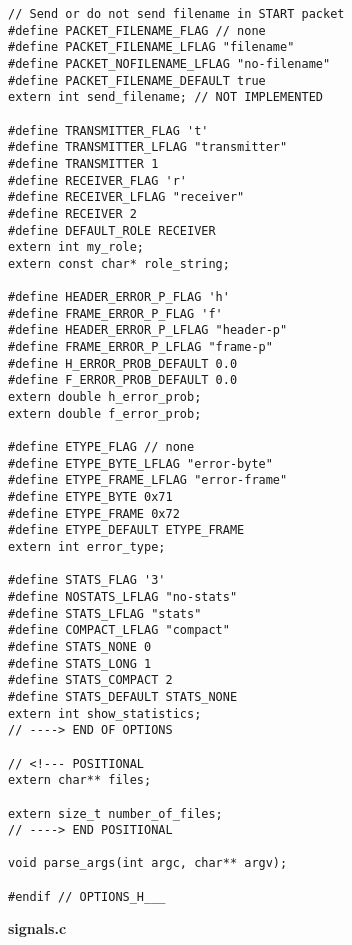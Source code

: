 \documentclass[subfiles]{main.tex}
\begin{document}
\begin{lstlisting}[style=rcom]
// Send or do not send filename in START packet
#define PACKET_FILENAME_FLAG // none
#define PACKET_FILENAME_LFLAG "filename"
#define PACKET_NOFILENAME_LFLAG "no-filename"
#define PACKET_FILENAME_DEFAULT true
extern int send_filename; // NOT IMPLEMENTED

#define TRANSMITTER_FLAG 't'
#define TRANSMITTER_LFLAG "transmitter"
#define TRANSMITTER 1
#define RECEIVER_FLAG 'r'
#define RECEIVER_LFLAG "receiver"
#define RECEIVER 2
#define DEFAULT_ROLE RECEIVER
extern int my_role;
extern const char* role_string;

#define HEADER_ERROR_P_FLAG 'h'
#define FRAME_ERROR_P_FLAG 'f'
#define HEADER_ERROR_P_LFLAG "header-p"
#define FRAME_ERROR_P_LFLAG "frame-p"
#define H_ERROR_PROB_DEFAULT 0.0
#define F_ERROR_PROB_DEFAULT 0.0
extern double h_error_prob;
extern double f_error_prob;

#define ETYPE_FLAG // none
#define ETYPE_BYTE_LFLAG "error-byte"
#define ETYPE_FRAME_LFLAG "error-frame"
#define ETYPE_BYTE 0x71
#define ETYPE_FRAME 0x72
#define ETYPE_DEFAULT ETYPE_FRAME
extern int error_type;

#define STATS_FLAG '3'
#define NOSTATS_LFLAG "no-stats"
#define STATS_LFLAG "stats"
#define COMPACT_LFLAG "compact"
#define STATS_NONE 0
#define STATS_LONG 1
#define STATS_COMPACT 2
#define STATS_DEFAULT STATS_NONE
extern int show_statistics;
// ----> END OF OPTIONS

// <!--- POSITIONAL
extern char** files;

extern size_t number_of_files;
// ----> END POSITIONAL

void parse_args(int argc, char** argv);

#endif // OPTIONS_H___
\end{lstlisting}

{\Large\textbf{signals.c}}
\end{document}
